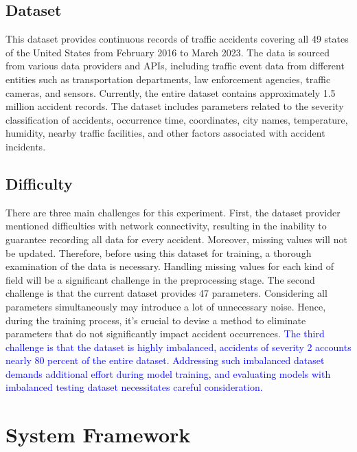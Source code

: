 \documentclass[10pt,twocolumn,letterpaper]{article}
\begin{document}
\begin{CJK}{UTF8}{bsmi}
\subsection{Dataset}
This dataset provides continuous records of traffic accidents covering all 49 states of the United States from February 2016 to March 2023. The data is sourced from various data providers and APIs, including traffic event data from different entities such as transportation departments, law enforcement agencies, traffic cameras, and sensors. Currently, the entire dataset contains approximately 1.5 million accident records.
The dataset includes parameters related to the severity classification of accidents, occurrence time, coordinates, city names, temperature, humidity, nearby traffic facilities, and other factors associated with accident incidents.

\subsection{Difficulty}
There are three main challenges for this experiment. First, the dataset provider mentioned difficulties with network connectivity, resulting in the inability to guarantee recording all data for every accident. Moreover, missing values will not be updated. Therefore, before using this dataset for training, a thorough examination of the data is necessary. Handling missing values for each kind of field will be a significant challenge in the preprocessing stage.
The second challenge is that the current dataset provides 47 parameters. Considering all parameters simultaneously may introduce a lot of unnecessary noise. Hence, during the training process, it's crucial to devise a method to eliminate parameters that do not significantly impact accident occurrences. \textcolor{blue}{The third challenge is that the dataset is highly imbalanced, accidents of severity 2 accounts nearly 80 percent of the entire dataset. Addressing such imbalanced dataset demands additional effort during model training, and evaluating models with imbalanced testing dataset necessitates careful consideration.}



\section{System Framework}
\label{sec:formatting}



\end{CJK}
\end{document}
